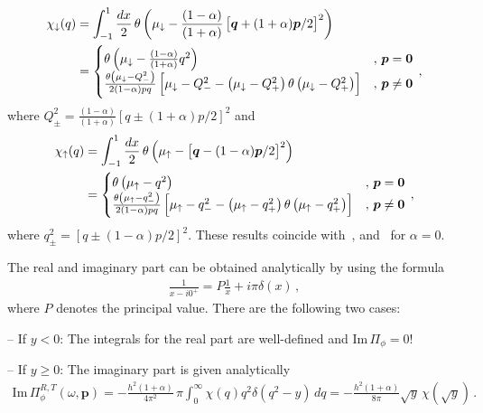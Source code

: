 \begin{align}
	\chi_{\downarrow}(q) &= \int_{-1}^1 \frac{dx}{2} \,
	\theta\left(\mu_{\downarrow}-\frac{(1-\alpha)}{(1+\alpha)}
	\left[\bm{q}+(1+\alpha)\bm{p}/2\right]^2
	\right) \notag \\
	&=
	\begin{cases}
		\theta\left(\mu_{\downarrow}-\frac{(1-\alpha)}{(1+\alpha)}
		q^2 \right) & ,\, \bm{p} = \bm{0} \\
		\frac{\theta\left( \mu_{\downarrow}-
			Q_{-}^2 \right)}{2(1-\alpha)pq} \left[
		\mu_{\downarrow}-Q_{-}^2 -
		\left(\mu_{\downarrow}-Q_{+}^2\right)
		\theta\left( \mu_{\downarrow}-Q_{+}^2 \right)
		\right] & ,\, \bm{p} \neq \bm{0}
	\end{cases} \,,
\end{align}
where $Q_{\pm}^2 = \frac{(1-\alpha)}{(1+\alpha)}\left[q\pm(1+\alpha)p/2\right]^2$ and
\begin{align}
	\chi_{\uparrow}(q) &= \int_{-1}^1 \frac{dx}{2} \,
	\theta\left(\mu_{\uparrow}-\left[\bm{q}-(1-\alpha)\bm{p}/2\right]^2
	\right) \notag \\
	&=
	\begin{cases}
		\theta\left(\mu_{\uparrow}-q^2\right) & ,\, \bm{p} = \bm{0} \\
		\frac{\theta\left( \mu_{\uparrow}-
			q_{-}^2 \right)}{2(1-\alpha)pq} \left[
		\mu_{\uparrow}-q_{-}^2 -
		\left(\mu_{\uparrow}-q_{+}^2\right)
		\theta\left( \mu_{\uparrow}-q_{+}^2 \right)
		\right] & ,\, \bm{p} \neq \bm{0}
	\end{cases} \,,
\end{align}
where $q_{\pm}^2 = \left[q\pm(1-\alpha)p/2\right]^2$. These results coincide with~\cite{Hu2022}, and~\cite{Punk2010} for $\alpha=0$.


The real and imaginary part can be obtained analytically by using the formula
\begin{align}
	\frac{1}{x-i0^+} = P\frac{1}{x} + i\pi\delta(x) \,,
\end{align}
%
where $P$ denotes the principal value. There are the following two cases:

-- If $y<0$: The integrals for the real part are well-defined and $\mathrm{Im}\,\Pi_{\phi} = 0$!

-- If $y\geq 0$: The imaginary part is given analytically
\begin{align}
	\mathrm{Im}\,\Pi^{R,T}_{\phi}(\omega, \bm{p}) = -\frac{h^2(1+\alpha)}{4\pi^2}\, \pi
	\int_0^{\infty} \chi(q) q^2 \delta(q^2-y) \, dq
	= -\frac{h^2(1+\alpha)}{8\pi} \sqrt{y} \, \chi(\sqrt{y}) \,.
\end{align}

